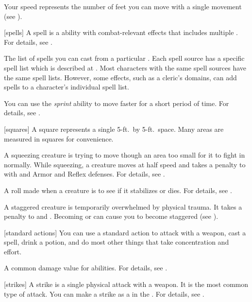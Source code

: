  Your speed represents the number of feet you can move with a single movement (see ).

[spells] A spell is a  ability with combat-relevant effects that includes multiple .
For details, see .

 The list of spells you can cast from a particular .
Each spell source has a specific spell list which is described at .
Most characters with the same spell sources have the same spell lists.
However, some effects, such as a cleric's domains, can add spells to a character's individual spell list.

 You can use the \textit{sprint} ability to move faster for a short period of time.
For details, see .

[squares] A square represents a single 5-ft.\ by 5-ft.\ space.
Many areas are measured in squares for convenience.

 A squeezing creature is trying to move though an area too small for it to fight in normally.
While squeezing, a creature moves at half speed and takes a  penalty to  with  and Armor and Reflex defenses.
For details, see .

 A roll made when a creature is  to see if it stabilizes or dies. For details, see .

 A staggered creature is temporarily overwhelmed by physical trauma.
It takes a  penalty to  and .
Becoming  or  can cause you to become staggered (see ).

[standard actions] You can use a standard action to attack with a weapon, cast a spell, drink a potion, and do most other things that take concentration and effort.

 A common damage value for abilities.
For details, see .

[strikes] A strike is a single physical attack with a weapon.
It is the most common type of attack.
You can make a strike as a  in the .
For details, see .

